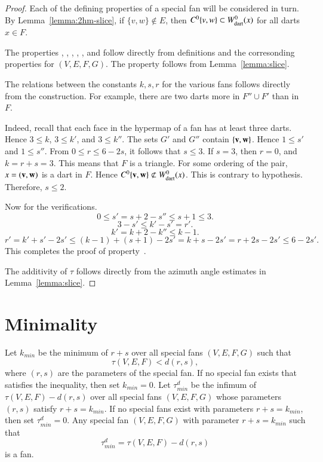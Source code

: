 \begin{proof}  Each of the defining properties of a special fan will be considered in turn.  By Lemma~\ref{lemma:2hm-slice}, if $\{v,w\}\not\in E$, then $C^0\{v,w\}\subset W^0_{\text{dart}}(x)$ for all darts $x\in F$.

The properties , , , , , and  follow directly from definitions and the corresonding properties for $(V,E,F,G)$.
The property  follows from Lemma~\ref{lemma:slice}.

The relations between the constants $k,s,r$ for the various fans follows directly from the construction.
For example, there are two darts more in $F''\cup F'$ than in $F$.  

  Indeed, recall that each face in the hypermap of a fan has at least three darts.  Hence $3\le k$, $3\le k'$, and $3\le k''$.
The sets $G'$ and $G''$ contain $\{{\mathbf v},{\mathbf w}\}$.  Hence $1\le s'$ and $1\le s''$.
From $0\le r\le 6 - 2s$, it follows that $s\le 3$.  If $s=3$, then $r=0$, and $k=r+s=3$.  This means that $F$ is a triangle.  For some ordering of the pair, $x=({\mathbf v},{\mathbf w})$ is a dart in $F$.
Hence  $C^0\{{\mathbf v},{\mathbf w}\} \not\subset W^0_{\text{dart}}(x)$.  This is contrary to hypothesis.  Therefore, $s\le 2$.

Now for the verifications.
$$0\le s' = s + 2 - s'' \le s+1\le 3.$$
$$3-s'\le k'-s' = r'.$$
$$k' = k + 2 - k'' \le k-1.$$
$$
r'= k'+s' - 2 s' \le (k-1) + (s+1) - 2s' =k+s - 2s' = r + 2s -2s' \le 6 - 2s'.
$$
This completes the proof of property~.

The additivity of $\tau$ follows directly from the azimuth angle estimates in Lemma~\ref{lemma:slice}.
\end{proof}


\section{Minimality}



\begin{definition}
Let $k_{min}$ be the minimum of $r+s$ over
all special fans $(V,E,F,G)$ such that 
\begin{equation}\label{eqn:kmin}
\tau(V,E,F) < d (r,s),
\end{equation}
where $(r,s)$ are the parameters of the special fan.
If no special fan exists that satisfies the inequality, then set $k_{min}=0$.
Let $\tau^d_{min}$ be the infimum of $\tau(V,E,F)-d(r,s)$ over all special fans
$(V,E,F,G)$ whose parameters $(r,s)$ satisfy $r+s=k_{min}$.  If no special fans
exist with parameters $r+s=k_{min}$, then set $\tau^d_{min}=0$.
Any special fan $(V,E,F,G)$ with parameter $r+s=k_{min}$ such that
$$
\tau^d_{min}= \tau(V,E,F)-d(r,s)
$$
is a   fan.
\end{definition}


